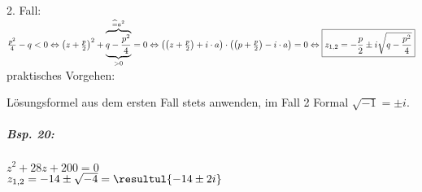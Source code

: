 2. Fall: $\frac{p^2}{4}-q < 0 \\
\Leftrightarrow \left(z+\frac{p}{2}\right)^2+\overbrace{\underbrace{q-\frac{p^2}{4}}_{>0}}^{\widehat=a^2}=0 \\
\Leftrightarrow \left(\left(z+\frac{p}{2}\right)+i\cdot a\right)\cdot \left(\left(p+\frac{p}{2}\right)-i\cdot a\right)=0\\
\Leftrightarrow \boxed{z_{1,2}=-\frac{p}{2}\pm i \sqrt{q-\frac{p^2}{4}}}$\\
praktisches Vorgehen:

Lösungsformel aus dem ersten Fall stets anwenden, im Fall 2 Formal $\sqrt{-1}=\pm i$.

\subparagraph{Bsp. 20:}\parskp
$z^2+28z+200=0$\\
$z_{1,2}=-14\pm \sqrt{-4}=\resultul{-14\pm 2i}$

